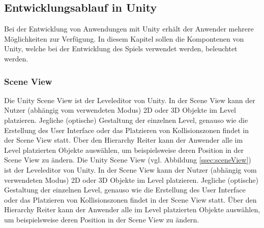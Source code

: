 \subsection{Entwicklungsablauf in Unity}
Bei der Entwicklung von Anwendungen mit Unity erhält der Anwender mehrere Möglichkeiten zur Verfügung. In diesem Kapitel sollen die Kompontenen von Unity, welche bei der Entwicklung des Spiels verwendet werden, beleuchtet werden.

\subsubsection{Scene View}
Die Unity Scene View ist der Leveleditor von Unity. In der Scene View kann der Nutzer (abhängig vom verwendeten Modus) 2D oder 3D Objekte im Level platzieren. Jegliche (optische) Gestaltung der einzelnen Level, genauso wie die Erstellung des User Interface oder das Platzieren von Kollisionszonen findet in der Scene View statt. Über den Hierarchy Reiter kann der Anwender alle im Level platzierten Objekte auswählen, um beispielsweise deren Position in der Scene View zu ändern.
Die Unity Scene View (vgl. Abbildung \ref{ssec:sceneView}) ist der Leveleditor von Unity. In der Scene View kann der Nutzer (abhängig vom verwendeten Modus) 2D oder 3D Objekte im Level platzieren. Jegliche (optische) Gestaltung der einzelnen Level, genauso wie die Erstellung des User Interface oder das Platzieren von Kollisionszonen findet in der Scene View statt. Über den Hierarchy Reiter kann der Anwender alle im Level platzierten Objekte auswählen, um beispielsweise deren Position in der Scene View zu ändern.

